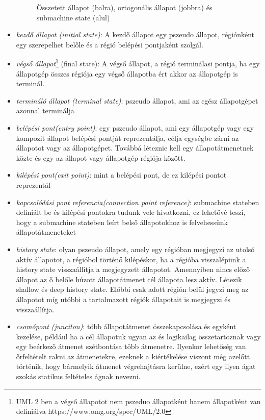 \begin{itemize}
\begin{figure}[!ht]
		\caption{Összetett állapot (balra), ortogonális állapot (jobbra) és submachine state (alul)}
	\end{figure}
	\item \emph{kezdő állapot (initial state)}: A kezdő állapot egy pszeudo állapot, régiónként egy szerepelhet belőle és a régió belépési pontjaként szolgál.
	\item \emph{végső állapot}\footnote{UML 2 ben a végső állapotot nem pszeduo állapotként hanem állapotként van definiálva https://www.omg.org/spec/UML/2.0} (final state): A végső állapot, a régió terminálasi pontja, ha egy állapotgép összes régiója egy végső állapotba ért akkor az állapotgép is terminál.
	\item \emph{termináló állapot (terminal state)}: pszeudo állapot, ami az egész állapotgépet azonnal terminálja
	\item \emph{belépési pont(entry point)}: egy pszeudo állapot, ami egy állapotgép vagy egy kompozit állapot belépési pontját reprezentálja, célja egységbe zárni az állapotot vagy az állapotgépet. Továbbá léteznie kell egy állapotátmenetnek közte és egy az állapot vagy állapotgép régiója között.
	\item \emph{kilépési pont(exit point)}: mint a belépési pont, de ez kilépési pontot reprezentál
	\item \emph{kapcsolódási pont referencia(connection point reference)}: submachine stateben definiált be és kilépési pontokra tudunk vele hivatkozni, ez lehetővé teszi, hogy a submachine stateben leírt belső állapotokhoz is felvehessünk állapotátmeneteket
	\item \emph{history state}: olyan pszeudo állapot, amely egy régióban megjegyzi az utolsó aktív állapotot, a régióbol történő kilépéskor, ha a régióba visszalépünk a history state visszaállítja a megjegyzett állapotot. Amennyiben nincs előző állapot az ő belőle húzott állapotátmenet cél állapota lesz aktív. Létezik shallow és deep history state. Előbbi csak adott régión belül jegyzi meg az állapotot míg utóbbi a tartalmazott régiók állapotait is megjegyzi és visszaállítja.
	\item \emph{csomópont (junciton)}: több állapotátmenet összekapcsolása és egyként kezelése, például ha a cél állapotuk ugyan az és logikailag összetartoznak vagy egy beérkező átmenet szétbontása több átmenetre. Ilyenkor lehetőség van őrfeltételt rakni az átmenetekre, ezeknek a kiértékelése viszont még azelőtt történik, hogy bármelyik átmenet végrehajtásra kerülne, ezért egy ilyen ágat szokás statikus feltételes ágnak nevezni.

\end{itemize}
